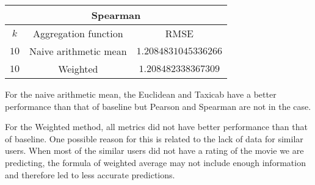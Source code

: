 \documentclass[final]{cvpr}
\begin{document}
\hspace{2em}

\begin{tabular}{| c | c | c |}
    \hline
    \multicolumn{3}{|c|}{\textbf{Spearman}}\\
    \hline
    $k$ & Aggregation function & RMSE\\
    \hline
    $10$ & Naive arithmetic mean & $1.2084831045336266$\\
    \hline
    $10$ & Weighted & $1.208482338367309$\\
    \hline
\end{tabular}

\hspace{10em}

For the naive arithmetic mean, the Euclidean and Taxicab have a better performance than that of baseline but Pearson and Spearman are not in the case.

For the Weighted method, all metrics did not have better performance than that of baseline. One possible reason for this is related to the lack of data for similar users. When most of the similar users did not have a rating of the movie we are predicting, the formula of weighted average may not include enough information and therefore led to less accurate predictions.
      
{\small
	
	
}
\end{document}
